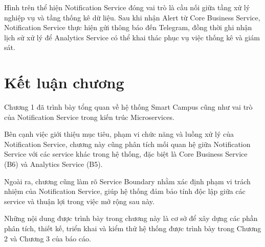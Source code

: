Hình trên thể hiện Notification Service đóng vai trò là cầu nối giữa tầng xử lý nghiệp vụ và tầng thống kê dữ liệu. Sau khi nhận Alert từ Core Business Service, Notification Service thực hiện gửi thông báo đến Telegram, đồng thời ghi nhận lịch sử xử lý để Analytics Service có thể khai thác phục vụ việc thống kê và giám sát.


\section{Kết luận chương}

Chương 1 đã trình bày tổng quan về hệ thống Smart Campus cũng như vai trò của Notification Service trong kiến trúc Microservices.

Bên cạnh việc giới thiệu mục tiêu, phạm vi chức năng và luồng xử lý của Notification Service, chương này cũng phân tích mối quan hệ giữa Notification Service với các service khác trong hệ thống, đặc biệt là Core Business Service (B6) và Analytics Service (B5).

Ngoài ra, chương cũng làm rõ Service Boundary nhằm xác định phạm vi trách nhiệm của Notification Service, giúp hệ thống đảm bảo tính độc lập giữa các service và thuận lợi trong việc mở rộng sau này.

Những nội dung được trình bày trong chương này là cơ sở để xây dựng các phần phân tích, thiết kế, triển khai và kiểm thử hệ thống được trình bày trong Chương 2 và Chương 3 của báo cáo.



